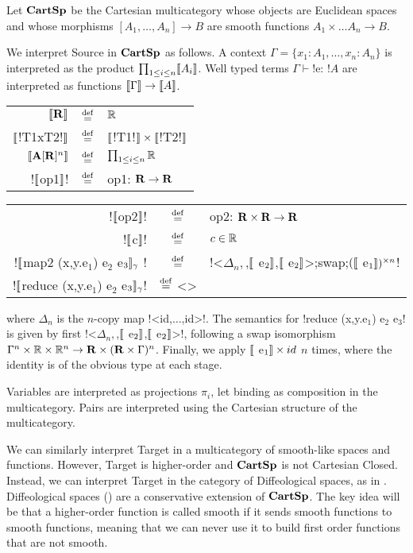 \begin{definition}[$\CartSp$]
Let $\CartSp$ be the Cartesian multicategory whose objects are Euclidean spaces
and whose morphisms $[A_1,\ldots,A_n]\to B$ are smooth functions $A_1\times\ldots A_n \to B$.

We interpret Source in $\CartSp$ as follows. A context $\Gamma=\{x_1:A_1,\ldots,x_n:A_n\}$ is interpreted as the product $\prod_{1\leq i \leq n}\llbracket A_i\rrbracket$.
Well typed terms $\Gamma\vdash$!e: !$A$ are interpreted as functions $\llbracket \Gamma\rrbracket\to\llbracket A\rrbracket$.

    \begin{tabular}{r c l}
    $\llbracket \mathbf{R} \rrbracket$ & $\stackrel {\mathrm{def}}=$& $\mathbb{R}$ \\
    $\llbracket$!T1xT2!$\rrbracket$ & $\stackrel {\mathrm{def}}=$& $\llbracket$!T1!$\rrbracket \times\llbracket$!T2!$\rrbracket$ \\
    $\llbracket \mathbf{A}[\mathbf{R}]^{n}\rrbracket$ & $\stackrel {\mathrm{def}}=$ & $\prod_{1\leq i \leq n} \mathbb{R}$ \\
    !$\llbracket$op1$\rrbracket$! & $\stackrel {\mathrm{def}}=$ & op1: $\mathbf{R}\to\mathbf{R}$ 
    \end{tabular}
    \begin{tabular}{r c l} 
        !$\llbracket$op2$\rrbracket$! & $\stackrel {\mathrm{def}}=$ & op2: $\mathbf{R}\times \mathbf{R}\to\mathbf{R}$ \\
        !$\llbracket$c$\rrbracket$! & $\stackrel {\mathrm{def}}=$ & $c\in\mathbb{R}$ \\
        !$\llbracket$map2 (x,y.e$_1$) e$_2$ e$_3\rrbracket_\gamma$ ! & $\stackrel {\mathrm{def}}=$ & !<$\Delta_n,$,$\llbracket$ e$_2\rrbracket$,$\llbracket$ e$_2\rrbracket$>;swap;$(\llbracket$ e$_1\rrbracket)^{\times n}$! \\
        !$\llbracket$reduce (x,y.e$_1$) e$_2$ e$_3\rrbracket_\gamma$! & $\stackrel {\mathrm{def}}=$ <> &
    \end{tabular}
where $\Delta_n$ is the $n$-copy map !<id,$\ldots$,id>!.
The semantics for !reduce (x,y.e$_1$) e$_2$ e$_3$! is given by first !<$\Delta_n,$,$\llbracket$ e$_2\rrbracket$,$\llbracket$ e$_2\rrbracket$>!, following a swap isomorphism  $\Gamma^n \times \mathbb{R} \times \mathbb{R}^n \to \mathbf{R} \times (\mathbf{R} \times \Gamma)^n$. 
Finally, we apply $\llbracket$ e$_1\rrbracket \times id$ $n$ times, where the identity is of the obvious type at each stage.

Variables are interpreted as projections $\pi_i$, let binding as composition in the multicategory. 
Pairs are interpreted using the Cartesian structure of the multicategory.
\end{definition}

We can similarly interpret Target in a multicategory of smooth-like spaces and functions. 
However, Target is higher-order and $\CartSp$ is not Cartesian Closed. 
Instead, we can interpret Target in the category of Diffeological spaces, 
as in \cite{huot2020correctness}. 
Diffeological spaces (\cite{iglesias2013diffeology}) are a conservative extension of $\CartSp$. 
The key idea will be that a higher-order function is called smooth if it sends smooth functions to smooth functions, meaning that we can never use it
to build first order functions that are not smooth.

